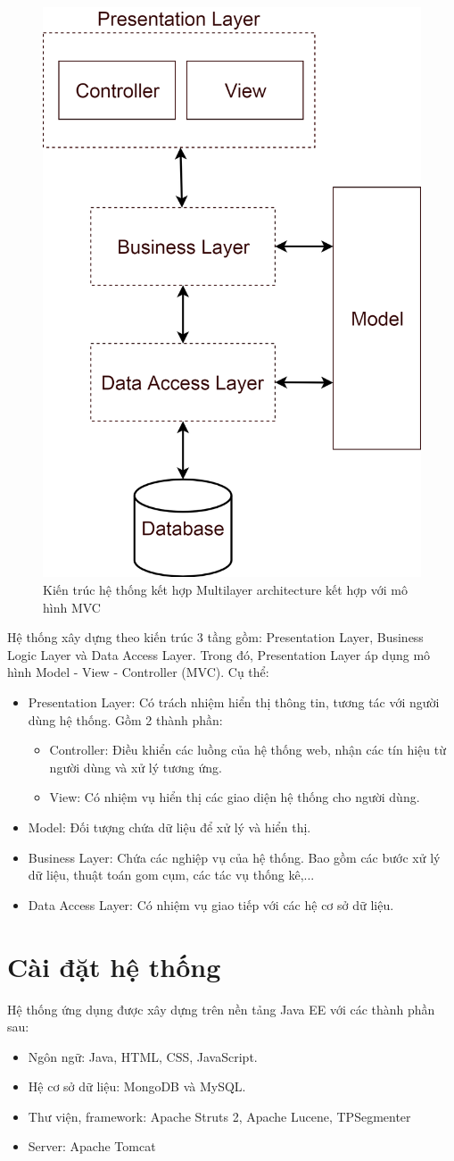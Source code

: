 	\begin{figure}[H]
		\centering
		\includegraphics[width=0.5\linewidth]{Chapter3/Chapter3Figs/Layers}
		\caption{Kiến trúc hệ thống kết hợp Multilayer architecture kết hợp với mô hình MVC}
		\label{fig:layers}
	\end{figure}
Hệ thống xây dựng theo kiến trúc 3 tầng gồm: Presentation Layer, Business Logic Layer và Data Access Layer. Trong đó, Presentation Layer áp dụng mô hình Model - View - Controller (MVC). Cụ thể:
	\begin{itemize}
		\item Presentation Layer: Có trách nhiệm hiển thị thông tin, tương tác với người dùng hệ thống. Gồm 2 thành phần:
			\begin{itemize}
				\item Controller: Điều khiển các luồng của hệ thống web, nhận các tín hiệu từ người dùng và xử lý tương ứng.
				\item View: Có nhiệm vụ hiển thị các giao diện hệ thống cho người dùng.
			\end{itemize}
		\item Model: Đối tượng chứa dữ liệu để xử lý và hiển thị.
		\item Business Layer: Chứa các nghiệp vụ của hệ thống. Bao gồm các bước xử lý dữ liệu, thuật toán gom cụm, các tác vụ thống kê,...
		\item Data Access Layer: Có nhiệm vụ giao tiếp với các hệ cơ sở dữ liệu.
	\end{itemize}

\section{Cài đặt hệ thống}%
Hệ thống ứng dụng được xây dựng trên nền tảng Java EE với các thành phần sau:
	\begin{itemize}
		\item Ngôn ngữ: Java, HTML, CSS, JavaScript.
		\item Hệ cơ sở dữ liệu: MongoDB và MySQL.
		\item Thư viện, framework: Apache Struts 2, Apache Lucene, TPSegmenter
		\item Server: Apache Tomcat
	\end{itemize}

